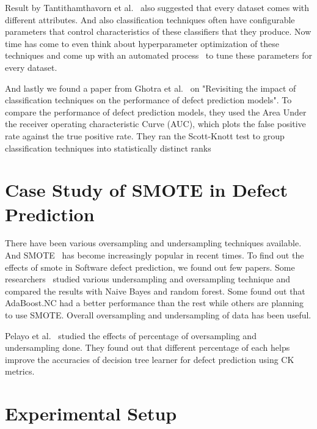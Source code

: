 \documentclass[conference]{IEEEtran}
\begin{document}
Result by Tantithamthavorn et al.~\cite{tantithamthavorn2016automated} also suggested that every dataset comes with different attributes. And also classification techniques often have configurable parameters
that control characteristics of these classifiers that they produce. Now time has come to even think about hyperparameter optimization of these techniques and come up with an automated process~\cite{fu2016tuning,agrawal2016wrong} to tune these parameters for every dataset.

And lastly we found a paper from Ghotra et al.~\cite{ghotra2015revisiting} on "Revisiting the impact of classification techniques on the performance of defect prediction models". To  compare  the  performance  of  defect prediction  models,  they  used  the  Area  Under  the receiver operating characteristic Curve (AUC), which plots  the  false  positive  rate  against  the  true  positive rate. They ran the Scott-Knott test to group classification techniques into statistically distinct ranks

\section{Case Study of SMOTE in Defect Prediction}
\label{smote}
There have been various oversampling and undersampling techniques available. And SMOTE~\cite{chawla2002smote} has become increasingly popular in recent times. To find out the effects of smote in Software defect prediction, we found out few papers. Some researchers~\cite{gray2009using,wang2013using} studied various undersampling and oversampling technique and compared the results with Naive Bayes and random forest. Some found out that AdaBoost.NC had a better performance than the rest while others are planning to use SMOTE. Overall oversampling and undersampling of data has been useful.

Pelayo et al.~\cite{pelayo2007applying} studied the effects of percentage of oversampling and undersampling done. They found out that different percentage of each helps improve the accuracies of decision tree learner for defect prediction using CK metrics.

\section{Experimental Setup}
\label{experiment}
\end{document}
